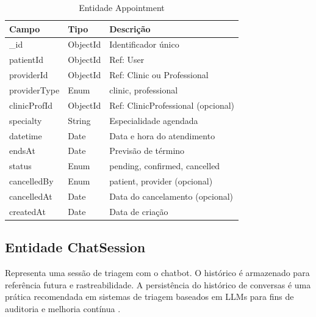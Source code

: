 \begin{table}[H]
  \centering
  \caption{Entidade Appointment}
  \label{tab:entity-appointment}
  \begin{tabular}{p{3cm}p{3cm}p{5.5cm}}
    \toprule
    \textbf{Campo} &
    \textbf{Tipo} &
    \textbf{Descrição} \\
    \midrule
    \_id           & ObjectId  & Identificador único \\
    patientId      & ObjectId  & Ref: User \\
    providerId     & ObjectId  & Ref: Clinic ou Professional \\
    providerType   & Enum      & clinic, professional \\
    clinicProfId   & ObjectId  & Ref: ClinicProfessional
                                 (opcional) \\
    specialty      & String    & Especialidade agendada \\
    datetime       & Date      & Data e hora do atendimento \\
    endsAt         & Date      & Previsão de término \\
    status         & Enum      & pending, confirmed,
                                 cancelled \\
    cancelledBy    & Enum      & patient, provider
                                 (opcional) \\
    cancelledAt    & Date      & Data do cancelamento
                                 (opcional) \\
    createdAt      & Date      & Data de criação \\
    \bottomrule
  \end{tabular}
\end{table}

\subsection{Entidade ChatSession}
\label{subsec:entity-chat}

Representa uma sessão de triagem com o chatbot.
O histórico é armazenado para referência futura
e rastreabilidade. A persistência do histórico
de conversas é uma prática recomendada em sistemas
de triagem baseados em LLMs para fins de auditoria
e melhoria contínua \cite{huo2025}.

